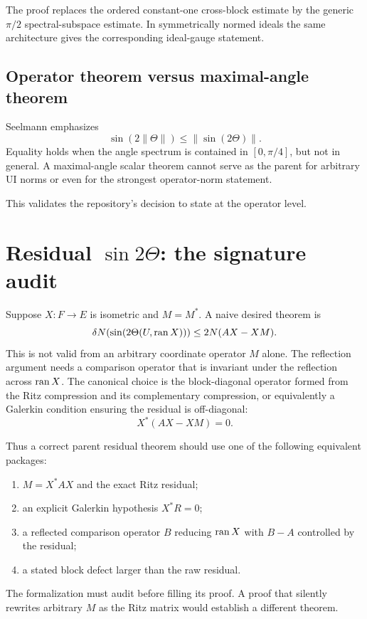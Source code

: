The proof replaces the ordered constant-one cross-block estimate by the generic $\pi/2$ spectral-subspace estimate. In symmetrically normed ideals the same architecture gives the corresponding ideal-gauge statement.

\subsection{Operator theorem versus maximal-angle theorem}

Seelmann emphasizes
\[
  \sin(2\|\Theta\|)\le\|\sin(2\Theta)\|.
\]
Equality holds when the angle spectrum is contained in $[0,\pi/4]$, but not in general. A maximal-angle scalar theorem cannot serve as the parent for arbitrary UI norms or even for the strongest operator-norm statement.

This validates the repository's decision to state  at the operator level.

\section{Residual $\sin 2\Theta$: the signature audit}

Suppose $X:F\to E$ is isometric and $M=M^*$. A naive desired theorem is
\[
  \delta N(\sin(2\Theta(U,\operatorname{ran} X)))
  \le2N(AX-XM).
\]
This is not valid from an arbitrary coordinate operator $M$ alone. The reflection argument needs a comparison operator that is invariant under the reflection across $\operatorname{ran} X$. The canonical choice is the block-diagonal operator formed from the Ritz compression and its complementary compression, or equivalently a Galerkin condition ensuring the residual is off-diagonal:
\[
  X^*(AX-XM)=0.
\]

Thus a correct parent residual theorem should use one of the following equivalent packages:
\begin{enumerate}
\item $M=X^*AX$ and the exact Ritz residual;
\item an explicit Galerkin hypothesis $X^*R=0$;
\item a reflected comparison operator $B$ reducing $\operatorname{ran} X$ with $B-A$ controlled by the residual;
\item a stated block defect larger than the raw residual.
\end{enumerate}

The formalization must audit  before filling its proof. A proof that silently rewrites arbitrary $M$ as the Ritz matrix would establish a different theorem.

